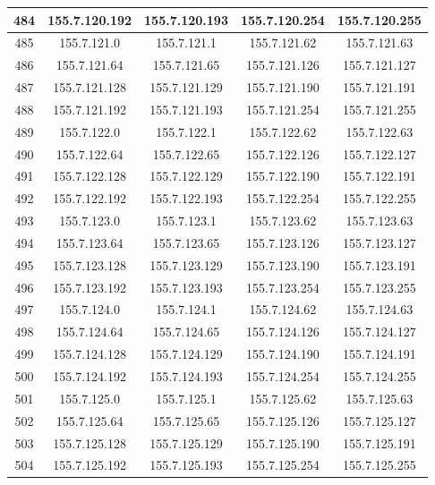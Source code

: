 \documentclass[letterpaper,12pt]{article}
\begin{document}
\begin{longtable}{|c|c|c|c|c|}
        484 & 155.7.120.192 & 155.7.120.193 & 155.7.120.254 & 155.7.120.255 \\ \hline
        485 & 155.7.121.0 & 155.7.121.1 & 155.7.121.62 & 155.7.121.63 \\ \hline
        486 & 155.7.121.64 & 155.7.121.65 & 155.7.121.126 & 155.7.121.127 \\ \hline
        487 & 155.7.121.128 & 155.7.121.129 & 155.7.121.190 & 155.7.121.191 \\ \hline
        488 & 155.7.121.192 & 155.7.121.193 & 155.7.121.254 & 155.7.121.255 \\ \hline
        489 & 155.7.122.0 & 155.7.122.1 & 155.7.122.62 & 155.7.122.63 \\ \hline
        490 & 155.7.122.64 & 155.7.122.65 & 155.7.122.126 & 155.7.122.127 \\ \hline
        491 & 155.7.122.128 & 155.7.122.129 & 155.7.122.190 & 155.7.122.191 \\ \hline
        492 & 155.7.122.192 & 155.7.122.193 & 155.7.122.254 & 155.7.122.255 \\ \hline
        493 & 155.7.123.0 & 155.7.123.1 & 155.7.123.62 & 155.7.123.63 \\ \hline
        494 & 155.7.123.64 & 155.7.123.65 & 155.7.123.126 & 155.7.123.127 \\ \hline
        495 & 155.7.123.128 & 155.7.123.129 & 155.7.123.190 & 155.7.123.191 \\ \hline
        496 & 155.7.123.192 & 155.7.123.193 & 155.7.123.254 & 155.7.123.255 \\ \hline
        497 & 155.7.124.0 & 155.7.124.1 & 155.7.124.62 & 155.7.124.63 \\ \hline
        498 & 155.7.124.64 & 155.7.124.65 & 155.7.124.126 & 155.7.124.127 \\ \hline
        499 & 155.7.124.128 & 155.7.124.129 & 155.7.124.190 & 155.7.124.191 \\ \hline
        500 & 155.7.124.192 & 155.7.124.193 & 155.7.124.254 & 155.7.124.255 \\ \hline
        501 & 155.7.125.0 & 155.7.125.1 & 155.7.125.62 & 155.7.125.63 \\ \hline
        502 & 155.7.125.64 & 155.7.125.65 & 155.7.125.126 & 155.7.125.127 \\ \hline
        503 & 155.7.125.128 & 155.7.125.129 & 155.7.125.190 & 155.7.125.191 \\ \hline
        504 & 155.7.125.192 & 155.7.125.193 & 155.7.125.254 & 155.7.125.255 \\ \hline

\end{longtable}
\end{document}
